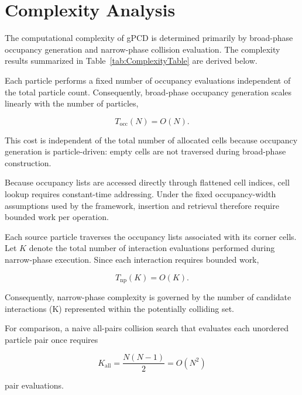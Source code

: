 

\section{Complexity Analysis}

The computational complexity of gPCD is determined primarily by
broad-phase occupancy generation and narrow-phase collision
evaluation. The complexity results summarized in
Table~\ref{tab:ComplexityTable} are derived below.





Each particle performs a fixed number of occupancy evaluations
independent of the total particle count. Consequently, broad-phase
occupancy generation scales linearly with the number of particles,

\begin{equation}
T_{\mathrm{occ}}(N)=O(N).
\end{equation}

This cost is independent of the total number of allocated cells because
occupancy generation is particle-driven: empty cells are not traversed
during broad-phase construction.

Because occupancy lists are accessed directly through flattened cell
indices, cell lookup requires constant-time addressing. Under the fixed
occupancy-width assumptions used by the framework, insertion and
retrieval therefore require bounded work per operation.

Each source particle traverses the occupancy lists associated with its
corner cells. Let $K$ denote the total number of interaction
evaluations performed during narrow-phase execution. Since each
interaction requires bounded work,

\begin{equation}
T_{\mathrm{np}}(K)=O(K).
\end{equation}

Consequently, narrow-phase complexity is governed by the number of
candidate interactions (K) represented within the potentially
colliding set.

For comparison, a naive all-pairs collision search that evaluates each
unordered particle pair once requires

\begin{equation}
K_{\mathrm{all}} =\frac{N(N-1)}{2}=O(N^2)
\label{niaeve}
\end{equation}

pair evaluations.


